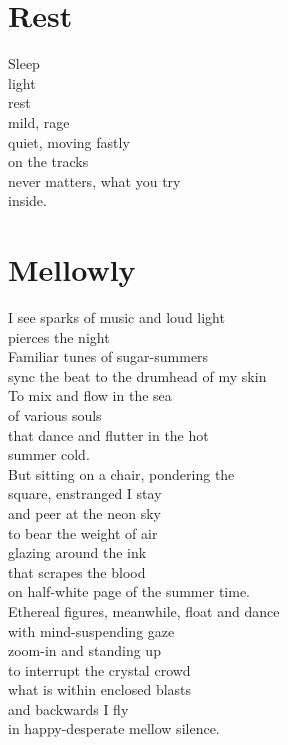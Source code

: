 \documentclass[a4paper,twoside, openany]{book}
\newenvironment{Verse}
  {\center\varwidth{\linewidth}\fontsize{18}{21.6}\selectfont}
  {\endvarwidth\endcenter}
\begin{document}
\chapter{Rest}
\begin{Verse}
Sleep\\
light\\
rest\\
mild, rage\\
quiet, moving fastly\\
on the tracks\\
never matters, what you try\\
inside.
\end{Verse}
\chapter{Mellowly}
\begin{Verse}
I see sparks of music and loud light\\
pierces the night\\
Familiar tunes of sugar-summers\\
sync the beat to the drumhead of my skin\\
To mix and flow in the sea\\
of various souls\\
that dance and flutter in the hot\\
summer cold.\\
But sitting on a chair, pondering the\\
square, enstranged I stay\\
and peer at the neon sky\\
to bear the weight of air\\
glazing around the ink\\
that scrapes the blood\\
on half-white page of the summer time.\\
Ethereal figures, meanwhile, float and dance\\
with mind-suspending gaze\\
zoom-in and standing up\\
to interrupt the crystal crowd\\
what is within enclosed blasts\\
and backwards I fly\\
in happy-desperate mellow silence.
\end{Verse}
\newpage\null\thispagestyle{empty}\newpage
\end{document}
